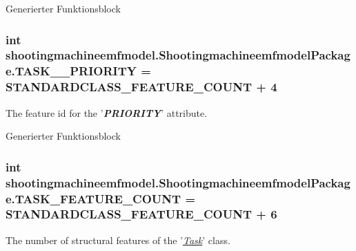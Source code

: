 Generierter Funktionsblock  \hypertarget{interfaceshootingmachineemfmodel_1_1_shootingmachineemfmodel_package_a503bb84ed071da23eaa6ddf93697203e}{
\subsubsection[{T\-A\-S\-K\-\_\-\-\_\-\-P\-R\-I\-O\-R\-I\-T\-Y}]{\setlength{\rightskip}{0pt plus 5cm}int shootingmachineemfmodel.\-Shootingmachineemfmodel\-Package.\-T\-A\-S\-K\-\_\-\-\_\-\-P\-R\-I\-O\-R\-I\-T\-Y = {\bf S\-T\-A\-N\-D\-A\-R\-D\-C\-L\-A\-S\-S\-\_\-\-F\-E\-A\-T\-U\-R\-E\-\_\-\-C\-O\-U\-N\-T} + 4}}\label{interfaceshootingmachineemfmodel_1_1_shootingmachineemfmodel_package_a503bb84ed071da23eaa6ddf93697203e}
The feature id for the '{\itshape {\bfseries P\-R\-I\-O\-R\-I\-T\-Y}}' attribute.

Generierter Funktionsblock  \hypertarget{interfaceshootingmachineemfmodel_1_1_shootingmachineemfmodel_package_a7938b93e2769090ce3b4ef54dfb6345d}{
\subsubsection[{T\-A\-S\-K\-\_\-\-F\-E\-A\-T\-U\-R\-E\-\_\-\-C\-O\-U\-N\-T}]{\setlength{\rightskip}{0pt plus 5cm}int shootingmachineemfmodel.\-Shootingmachineemfmodel\-Package.\-T\-A\-S\-K\-\_\-\-F\-E\-A\-T\-U\-R\-E\-\_\-\-C\-O\-U\-N\-T = {\bf S\-T\-A\-N\-D\-A\-R\-D\-C\-L\-A\-S\-S\-\_\-\-F\-E\-A\-T\-U\-R\-E\-\_\-\-C\-O\-U\-N\-T} + 6}}\label{interfaceshootingmachineemfmodel_1_1_shootingmachineemfmodel_package_a7938b93e2769090ce3b4ef54dfb6345d}
The number of structural features of the '{\itshape \hyperlink{interfaceshootingmachineemfmodel_1_1_task}{Task}}' class.

